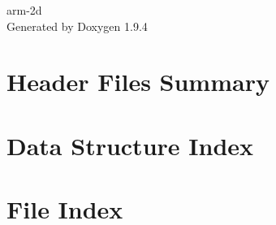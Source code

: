 \documentclass[twoside]{book}
\newcommand{\+}{\discretionary{\mbox{\scriptsize$\hookleftarrow$}}{}{}}
\newcommand{\clearemptydoublepage}{%
    \newpage{\pagestyle{empty}\cleardoublepage}%
  }
\begin{document}
  \raggedbottom
    \hypersetup{pageanchor=false,
                bookmarksnumbered=true,
                pdfencoding=unicode
               }
  \begin{titlepage}
  \vspace*{7cm}
  \begin{center}%
  {\Large arm-\/2d}\\
  \vspace*{1cm}
  {\large Generated by Doxygen 1.9.4}\\
  \end{center}
  \end{titlepage}
  \clearemptydoublepage
  \tableofcontents
  \clearemptydoublepage
  \hypersetup{pageanchor=true}
\chapter{Header Files Summary}
\label{md__Users_gabwan01_Documents_Work_CPMK_Git_EndpointAI_Kernels_Research_Arm_2D_Library_Include_README}

\chapter{Data Structure Index}

\chapter{File Index}

\end{document}
